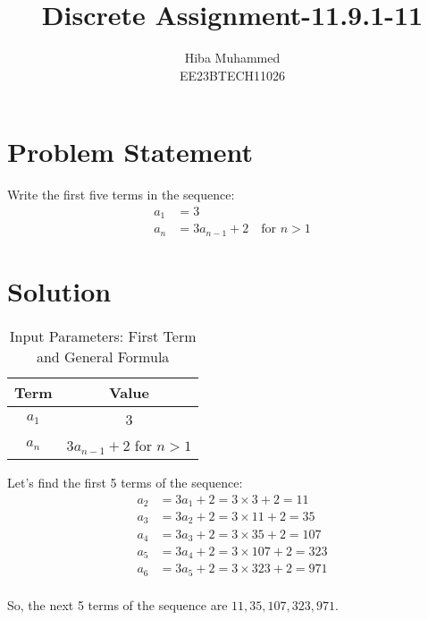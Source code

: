 \documentclass[12pt]{article}
\begin{document}
\title{Discrete Assignment-11.9.1-11}
\author{Hiba Muhammed \\
        EE23BTECH11026}
\maketitle

\section*{Problem Statement}
Write the first five terms in the sequence:
\[
\begin{aligned}
a_1 &= 3 \\
a_n &= 3a_{n-1} + 2 \quad \text{for } n > 1
\end{aligned}
\]

\section*{Solution}
\begin{table}[h]
  \centering
  \caption{Input Parameters: First Term and General Formula}
  \begin{tabular}{|c|c|}
    \hline
    \textbf{Term} & \textbf{Value} \\
    \hline
    \(a_1\) & 3 \\
    \(a_n\) & \(3a_{n-1} + 2\) for \(n > 1\) \\
    \hline
  \end{tabular}
\end{table}

Let's find the first 5 terms of the sequence:
\[\begin{aligned}
a_2 &= 3a_1 + 2 = 3 \times 3 + 2 = 11 \\a_3 &= 3a_2 + 2 = 3 \times 11 + 2 = 35 \\
a_4 &= 3a_3 + 2 = 3 \times 35 + 2 = 107 \\a_5 &= 3a_4 + 2 = 3 \times 107 + 2 = 323 \\
a_6 &= 3a_5 + 2 = 3 \times 323 + 2 = 971 \\\end{aligned}
\]

So, the next 5 terms of the sequence are \(11, 35, 107, 323, 971\).
\end{document}
